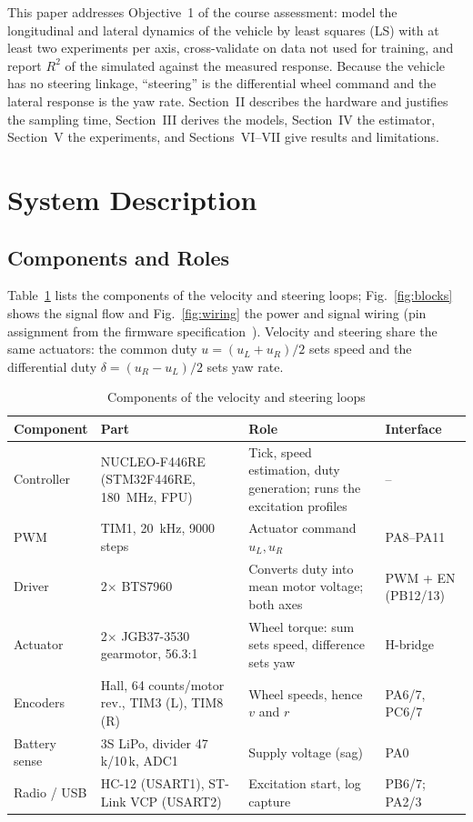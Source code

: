 \documentclass[conference]{IEEEtran}\newcommand{\haveieee}{}%
\begin{document}
This paper addresses Objective~1 of the course assessment: model the longitudinal and lateral dynamics of the vehicle by least squares (LS) with at least two experiments per axis, cross-validate on data not used for training, and report $R^2$ of the simulated against the measured response. Because the vehicle has no steering linkage, ``steering'' is the differential wheel command and the lateral response is the yaw rate. Section~II describes the hardware and justifies the sampling time, Section~III derives the models, Section~IV the estimator, Section~V the experiments, and Sections~VI--VII give results and limitations.

\section{System Description}
\subsection{Components and Roles}
Table~\ref{tab:comp} lists the components of the velocity and steering loops; Fig.~\ref{fig:blocks} shows the signal flow and Fig.~\ref{fig:wiring} the power and signal wiring (pin assignment from the firmware specification~\cite{fwspec}). Velocity and steering share the same actuators: the common duty $u=(u_L+u_R)/2$ sets speed and the differential duty $\delta=(u_R-u_L)/2$ sets yaw rate.

\begin{table}[!t]
\caption{Components of the velocity and steering loops}
\label{tab:comp}
\centering\footnotesize
\setlength{\tabcolsep}{2.5pt}
\begin{tabular}{@{}p{1.45cm}p{1.75cm}p{3.3cm}p{1.35cm}@{}}
\toprule
\textbf{Component} & \textbf{Part} & \textbf{Role} & \textbf{Interface}\\
\midrule
Controller & NUCLEO-F446RE (STM32F446RE, 180~MHz, FPU) & Tick, speed estimation, duty generation; runs the excitation profiles & --\\
PWM & TIM1, 20~kHz, 9000 steps & Actuator command $u_L,u_R$ & PA8--PA11\\
Driver & 2$\times$ BTS7960~\cite{bts7960} & Converts duty into mean motor voltage; both axes & PWM + EN (PB12/13)\\
Actuator & 2$\times$ JGB37-3530 gearmotor, 56.3:1 & Wheel torque: sum sets speed, difference sets yaw & H-bridge\\
Encoders & Hall, 64 counts/motor rev., TIM3 (L), TIM8 (R) & Wheel speeds, hence $v$ and $r$ & PA6/7, PC6/7\\
Battery sense & 3S LiPo, divider 47\,k/10\,k, ADC1 & Supply voltage (sag) & PA0\\
Radio / USB & HC-12 (USART1), ST-Link VCP (USART2) & Excitation start, log capture & PB6/7; PA2/3\\
\bottomrule
\end{tabular}
\end{table}
\end{document}
